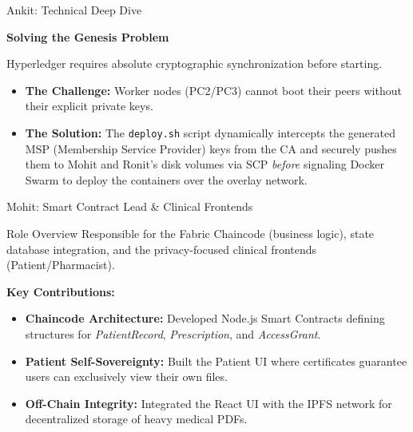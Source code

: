 \documentclass[10pt,aspectratio=169]{beamer}
\begin{document}
\begin{frame}{Ankit: Technical Deep Dive}
    \begin{center}
        \textbf{Solving the Genesis Problem}
    \end{center}
    \vspace{0.2cm}
    Hyperledger requires absolute cryptographic synchronization before starting.
    \begin{itemize}
        \item \textbf{The Challenge:} Worker nodes (PC2/PC3) cannot boot their peers without their explicit private keys.
        \item \textbf{The Solution:} The \texttt{deploy.sh} script dynamically intercepts the generated MSP (Membership Service Provider) keys from the CA and securely pushes them to Mohit and Ronit's disk volumes via SCP \textit{before} signaling Docker Swarm to deploy the containers over the overlay network.
    \end{itemize}
\end{frame}


\begin{frame}{Mohit: Smart Contract Lead \& Clinical Frontends}
    \begin{block}{Role Overview}
        Responsible for the Fabric Chaincode (business logic), state database integration, and the privacy-focused clinical frontends (Patient/Pharmacist).
    \end{block}
    \vspace{0.5cm}
    \textbf{Key Contributions:}
    \begin{itemize}
        \item \textbf{Chaincode Architecture:} Developed Node.js Smart Contracts defining structures for \textit{PatientRecord}, \textit{Prescription}, and \textit{AccessGrant}.
        \item \textbf{Patient Self-Sovereignty:} Built the Patient UI where certificates guarantee users can exclusively view their own files.
        \item \textbf{Off-Chain Integrity:} Integrated the React UI with the IPFS network for decentralized storage of heavy medical PDFs.
    \end{itemize}
\end{frame}
\end{document}
